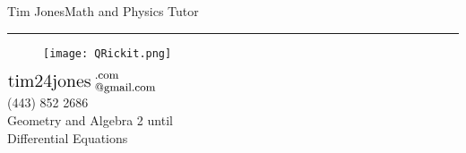 \documentclass[10pt,oneside,final]{article}
\begin{document}
  \vspace*{2.5mm}
\LARGE Tim Jones\hfill\normalsize Math and Physics Tutor
\vspace*{1mm}
\noindent\rule{\textwidth}{0.4pt}
\begin{minipage}[c]{0.4\textwidth}
\begin{figure}[H]
\texttt{[image: QRickit.png]}
\end{figure}
\end{minipage}\strut
\begin{minipage}[c]{0.6\textwidth}
\RaggedRight$\mbox{\Large{tim24jones}}^{\mbox{\small{ .com}}}_{\mbox{\small{ @gmail.com}}}$\\
\vspace*{3.5mm}
\RaggedRight\large (443) 852 2686\\
\vspace*{3.5mm}
\small Geometry and Algebra 2 until\\ Differential Equations
\end{minipage}
\end{document}
